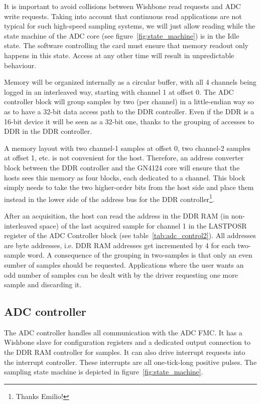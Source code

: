 \documentclass{article}
\begin{document}
It is important to avoid collisions between Wishbone read requests and ADC write requests. Taking into account that continuous read applications are not typical for such high-speed sampling systems, we will just allow reading while the state machine of the ADC core (see figure~\ref{fig:state_machine}) is in the Idle state. The software controlling the card must ensure that memory readout only happens in this state. Access at any other time will result in unpredictable behaviour. 

Memory will be organized internally as a circular buffer, with all 4 channels being logged in an interleaved way, starting with channel 1 at offset 0. The ADC controller block will group samples by two (per channel) in a little-endian way so as to have a 32-bit data access path to the DDR controller. Even if the DDR is a 16-bit device it will be seen as a 32-bit one, thanks to the grouping of accesses to DDR in the DDR controller.

A memory layout with two channel-1 samples at offset 0, two channel-2 samples at offset 1, etc. is not convenient for the host. Therefore, an address converter block between the DDR controller and the GN4124 core will ensure that the hosts sees this memory as four blocks, each dedicated to a channel. This block simply needs to take the two higher-order bits from the host side and place them instead in the lower side of the address bus for the DDR controller\footnote{Thanks Emilio!}.
 
After an acquisition, the host can read the address in the DDR RAM (in non-interleaved space) of the last acquired sample for channel 1 in the LASTPOSR register of the ADC Controller block (see table~\ref{tab:adc_control2}). All addresses are byte addresses, i.e. DDR RAM addresses get incremented by 4 for each two-sample word. A consequence of the grouping in two-samples is that only an even sumber of samples should be requested. Applications where the user wants an odd number of samples can be dealt with by the driver requesting one more sample and discarding it. 

\subsection{ADC controller}
The ADC controller handles all communication with the ADC FMC. It has a Wishbone slave for configuration registers and a dedicated output connection to the DDR RAM controller for samples. It can also drive interrupt requests into the interrupt controller. These interrupts are all one-tick-long positive pulses. The sampling state machine is depicted in figure~\ref{fig:state_machine}. 
\end{document}
